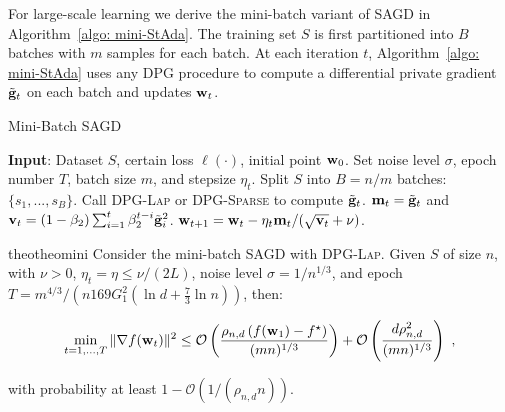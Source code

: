 \documentclass[11pt]{article}
\begin{document}
For large-scale learning we derive the mini-batch variant of \textsc{SAGD} in Algorithm~\ref{algo: mini-StAda}. 
The training set $S$ is first partitioned into $B$ batches with $m$ samples for each batch. 
At each iteration $t$, Algorithm~\ref{algo: mini-StAda} uses any \textsc{DPG} procedure to compute a differential private gradient $\tilde {\mathbf{g}}_t$ on each batch and updates $\mathbf{w}_t$. 
\begin{algorithm}[H]
\caption{Mini-Batch \textsc{SAGD}}
\begin{algorithmic}[1] \label{algo: mini-StAda}
\STATE \textbf{Input}: Dataset $S$,  certain loss $\ell(\cdot)$, initial point $\mathbf{w}_0$.
\STATE Set noise level $\sigma$, epoch number $T$,  batch size $m$, and stepsize $\eta_t$.
\STATE Split $S$ into $B=n/m$ batches: $\{ s_1,..., s_B\}$.
\STATE \label{line:dpgmini} Call \textsc{DPG-Lap} or \textsc{DPG-Sparse} to compute $\tilde {\mathbf{g}}_t$.
\STATE \label{line:mini1} $\mathbf{m}_t = \tilde {\mathbf{g}}_t$ and $\mathbf{v}_t = \left(1-\beta_{2}\right) \sum_{i=1}^{t} \beta_{2}^{t-i} \tilde {\mathbf{g}}_{i}^{2}$.
\STATE \label{line:mini2} $\mathbf{w}_{t+1}=\mathbf{w}_{t}-\eta_t \mathbf{m}_t /(\sqrt{\mathbf{v}_t}+\nu)$.
\ENDFOR
\ENDFOR 
\end{algorithmic}
\end{algorithm} \vspace{-0.1in}

\begin{restatable}{theo}{theomini}
\label{thm: main_rmsprop_mini}
Consider the mini-batch \textsc{SAGD} with \textsc{DPG-Lap}. 
Given $S$ of size $n$, with $\nu >0$, $\eta_t = \eta \leq \nu/(2L)$, noise level $\sigma = 1/n^{1/3}$, and epoch $T = m^{4/3}/\left(n169G_1^2(\ln d + \frac{7}{3}\ln n)\right)$, then:
 \begin{small}
\begin{equation*}
\begin{split}
 \min_{t = 1,..., T}\|\nabla f(\mathbf{w}_t)\|^2 
 \leq\mathcal{O} \left( \frac{\rho_{n,d} \left(f(\mathbf{w}_1) - f^\star \right)}{(mn)^{1/3}} \right)+\mathcal{O} \left( \frac{d \rho_{n,d}^2}{(mn)^{1/3}}\right)~,
 \end{split}
\end{equation*}
\end{small}
with probability at least $1-\mathcal{O} \left(1/(\rho_{n,d} n)\right)$.
\end{restatable}
\end{document}
